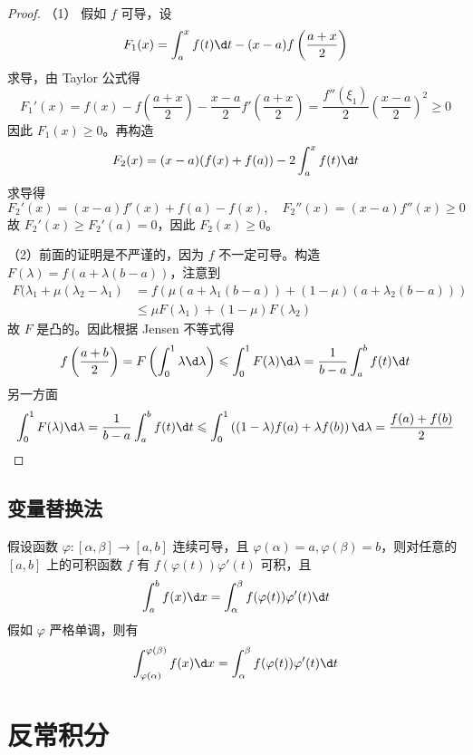 \begin{proof}
	（1） 假如 $f$ 可导，设
	\[ F_1(x) = \int_{a}^{x} f(t) \d t - (x-a)f\left(\frac{a+x}{2}\right) \]
	求导，由 Taylor 公式得
	\[ F_1'(x) = f(x) - f\left(\frac{a+x}{2}\right) - \frac{x-a}{2}f'\left(\frac{a+x}{2}\right) = \frac{f''(\xi_1)}{2} \left(\frac{x-a}{2}\right)^2 \geqslant 0 \]
	因此 $F_1(x) \geqslant 0$。再构造
	\[ F_2(x) = (x - a)(f(x) + f(a)) - 2 \int_{a}^{x} f(t) \d t \]
	求导得
	\[ F_2'(x) = (x-a) f'(x) + f(a) - f(x), \quad F_2''(x) = (x-a)f''(x) \geqslant 0 \]
	故 $F_2'(x) \geqslant F_2'(a) = 0$，因此 $F_2(x) \geqslant 0$。

	（2）前面的证明是不严谨的，因为 $f$ 不一定可导。构造 $F(\lambda) = f(a + \lambda(b - a))$，注意到
	\[ \begin{aligned}
			F(\lambda_1 + \mu(\lambda_2 - \lambda_1)
			 & = f(\mu(a + \lambda_1(b-a)) + (1 - \mu)(a + \lambda_2(b-a))) \\
			 & \leqslant \mu F(\lambda_1) + (1 - \mu) F(\lambda_2)
		\end{aligned}  \]
	故 $F$ 是凸的。因此根据 Jensen 不等式得
	\[ f\left(\frac{a+b}{2}\right) = F\left(\int_{0}^{1} \lambda \d \lambda \right) \leqslant \int_{0}^{1} F(\lambda) \d \lambda = \frac{1}{b-a}\int_{a}^{b} f(t) \d t \]
	另一方面
	\[ \int_{0}^{1} F(\lambda) \d \lambda = \frac{1}{b-a}\int_{a}^{b} f(t) \d t \leqslant \int_{0}^{1} \left((1 - \lambda)f(a) + \lambda f(b)\right) \d \lambda = \frac{f(a) + f(b)}{2} \]
\end{proof}

\subsection{变量替换法}

\begin{theorem}
	假设函数 $\varphi : [\alpha, \beta] \to [a, b]$ 连续可导，且 $\varphi(\alpha) = a, \varphi(\beta) = b$，则对任意的 $[a, b]$ 上的可积函数 $f$ 有 $f(\varphi(t))\varphi'(t)$ 可积，且
	\[ \int_{a}^{b} f(x) \d x = \int_{\alpha}^{\beta} f(\varphi(t)) \varphi'(t) \d t \]
	假如 $\varphi$ 严格单调，则有
	\[ \int_{\varphi(\alpha)}^{\varphi(\beta)} f(x) \d x = \int_{\alpha}^{\beta} f(\varphi(t)) \varphi'(t) \d t \]

\end{theorem}

\section{反常积分}


